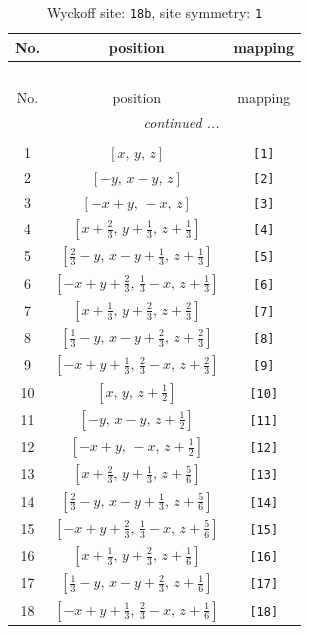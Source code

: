 \documentclass[fleqn,8pt]{jsarticle}
\begin{document}
\begin{longtable}{ccc}
\caption{Wyckoff site: {\tt 18b}, site symmetry: {\tt 1}}
 \\
 \hline \hline
No. & position & mapping \\ \hline \endfirsthead

\multicolumn{2}{l}{\tablename\ \thetable{}} \\
 \hline \hline
No. & position & mapping \\ \hline \endhead

 \hline \hline
\multicolumn{2}{r}{\footnotesize\it continued ...} \\ \endfoot

 \hline \hline
\multicolumn{2}{r}{} \\ \endlastfoot

1 & $\left[ x,\, y,\, z \right]$ & {\tt [1]} \\ \hline
2 & $\left[ - y,\, x - y,\, z \right]$ & {\tt [2]} \\ \hline
3 & $\left[ - x + y,\, - x,\, z \right]$ & {\tt [3]} \\ \hline
4 & $\left[ x + \frac{2}{3},\, y + \frac{1}{3},\, z + \frac{1}{3} \right]$ & {\tt [4]} \\ \hline
5 & $\left[ \frac{2}{3} - y,\, x - y + \frac{1}{3},\, z + \frac{1}{3} \right]$ & {\tt [5]} \\ \hline
6 & $\left[ - x + y + \frac{2}{3},\, \frac{1}{3} - x,\, z + \frac{1}{3} \right]$ & {\tt [6]} \\ \hline
7 & $\left[ x + \frac{1}{3},\, y + \frac{2}{3},\, z + \frac{2}{3} \right]$ & {\tt [7]} \\ \hline
8 & $\left[ \frac{1}{3} - y,\, x - y + \frac{2}{3},\, z + \frac{2}{3} \right]$ & {\tt [8]} \\ \hline
9 & $\left[ - x + y + \frac{1}{3},\, \frac{2}{3} - x,\, z + \frac{2}{3} \right]$ & {\tt [9]} \\ \hline
10 & $\left[ x,\, y,\, z + \frac{1}{2} \right]$ & {\tt [10]} \\ \hline
11 & $\left[ - y,\, x - y,\, z + \frac{1}{2} \right]$ & {\tt [11]} \\ \hline
12 & $\left[ - x + y,\, - x,\, z + \frac{1}{2} \right]$ & {\tt [12]} \\ \hline
13 & $\left[ x + \frac{2}{3},\, y + \frac{1}{3},\, z + \frac{5}{6} \right]$ & {\tt [13]} \\ \hline
14 & $\left[ \frac{2}{3} - y,\, x - y + \frac{1}{3},\, z + \frac{5}{6} \right]$ & {\tt [14]} \\ \hline
15 & $\left[ - x + y + \frac{2}{3},\, \frac{1}{3} - x,\, z + \frac{5}{6} \right]$ & {\tt [15]} \\ \hline
16 & $\left[ x + \frac{1}{3},\, y + \frac{2}{3},\, z + \frac{1}{6} \right]$ & {\tt [16]} \\ \hline
17 & $\left[ \frac{1}{3} - y,\, x - y + \frac{2}{3},\, z + \frac{1}{6} \right]$ & {\tt [17]} \\ \hline
18 & $\left[ - x + y + \frac{1}{3},\, \frac{2}{3} - x,\, z + \frac{1}{6} \right]$ & {\tt [18]} \\
\end{longtable}
\end{document}
